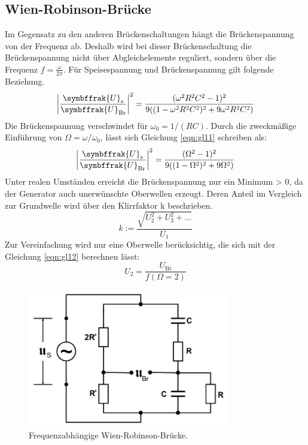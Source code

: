 \subsection{Wien-Robinson-Brücke}
\label{sec:Theorie5}
Im Gegensatz zu den anderen Brückenschaltungen hängt die Brückenspannung von der Frequenz ab.
Deshalb wird bei dieser Brückenschaltung die Brückenspannung nicht über Abgleichelemente reguliert, sondern über die Frequenz $f = \frac{\omega}{2 \pi}$.
Für Speisespannung und Brückenspannung gilt folgende Beziehung.
\begin{equation}
  \left\lvert \frac{\symbffrak{U}_{\text{s}}}{\symbffrak{U}_{\text{Br}}} \right\rvert^2 = \frac{(\omega^2 R^2 C^2 - 1)^2}{9((1 - \omega^2 R^2 C^2)^2 + 9 \omega^2 R^2 C^2)}
  \label{eqn:gl11}
\end{equation}
Die Brückenspannung verschwindet für $\omega_0 = 1/(RC)$.
Durch die zweckmäßige Einführung von $\Omega = \omega/\omega_0$, lässt sich Gleichung \eqref{eqn:gl11} schreiben als:
\begin{equation}
  \left\lvert \frac{\symbffrak{U}_{\text{s}}}{\symbffrak{U}_{\text{Br}}} \right\rvert^2 = \frac{(\Omega^2 - 1)^2}{9((1 - \Omega^2)^2 + 9 \Omega^2)}
  \label{eqn:gl12}
\end{equation}
Unter realen Umständen erreicht die Brückenspannung nur ein Minimum > 0, da der Generator auch unerwünschte Oberwellen erzeugt.
Deren Anteil im Vergleich zur Grundwelle wird über den Klirrfaktor k beschrieben.
\begin{equation}
  k := \frac{\sqrt{U^2_2 + U^2_3 + ...}}{U_1}
  \label{eqn:13}
\end{equation}
Zur Vereinfachung wird nur eine Oberwelle berücksichtig, die sich mit der Gleichung \eqref{eqn:gl12} berechnen lässt:
\begin{equation}
  U_2 = \frac{U_{\text{Br}}}{f(\Omega =2)}
  \label{eqn:14}
\end{equation}
\begin{figure}
  \includegraphics[height=6cm]{data/Schaltung6.jpg}
  \centering
  \caption{Frequenzabhängige Wien-Robinson-Brücke.}
  \label{fig:Schaltung6}
\end{figure}
\FloatBarrier

